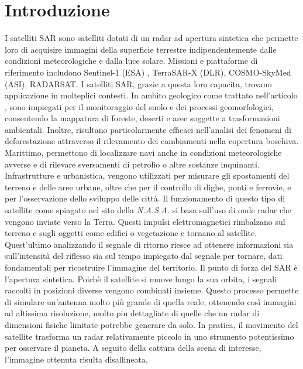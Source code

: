 
\chapter{Introduzione}
I satelliti SAR sono satelliti dotati di un radar ad apertura sintetica che permette
loro di acquisire immagini della superficie terrestre indipendentemente dalle 
condizioni meteorologiche e dalla luce solare. 
Missioni e piattaforme di riferimento includono Sentinel-1 (ESA) \cite{esa_sentinel1}, TerraSAR-X (DLR), 
COSMO-SkyMed (ASI), RADARSAT.
I satelliti SAR, grazie a questa loro 
capacita, trovano applicazione in molteplici contesti. In ambito geologico come trattato nell'articolo \cite{nhess-20-2379-2020}, 
sono impiegati per il monitoraggio del suolo e dei processi 
geomorfologici, consentendo la mappatura di foreste, deserti e aree soggette a 
trasformazioni ambientali. Inoltre, risultano particolarmente efficaci nell’analisi 
dei fenomeni di deforestazione attraverso il rilevamento dei cambiamenti nella 
copertura boschiva. Marittimo, permettono di localizzare navi anche in condizioni 
meteorologiche avverse e di rilevare sversamenti di petrolio o altre sostanze 
inquinanti. Infrastrutture e urbanistica, vengono utilizzati per misurare gli 
spostamenti del terreno e delle aree urbane, oltre che per il controllo di dighe, 
ponti e ferrovie, e per l’osservazione dello sviluppo delle città. Il funzionamento 
di questo tipo di satellite come spiagato nel sito della \textit{N.A.S.A.} \cite{nasa_sar} si basa sull'uso di  onde radar che vengono inviate verso la Terra. 
Questi impulsi elettromagnetici rimbalzano sul terreno e sugli 
oggetti come edifici o vegetazione e tornano al satellite. 
Quest'ultimo analizzando il segnale di 
ritorno riesce ad ottenere informazioni sia sull'intensità del riflesso sia sul tempo impiegato 
dal segnale per tornare, dati fondamentali per ricostruire l'immagine del territorio. Il punto 
di forza del SAR è l'apertura sintetica. Poichè il satellite si muove lungo la sua orbita, i 
segnali raccolti in posizioni diverse vengono combinati insieme. Questo processo permette di 
simulare un'antenna molto più grande di quella reale, ottenendo così immagini ad altissima 
risoluzione, molto piu dettagliate di quelle che un radar di dimensioni fisiche limitate potrebbe 
generare da solo. In pratica, il movimento del satellite trasforma un radar relativamente piccolo 
in uno strumento potentissimo per osservare il pianeta. 
A seguito della cattura della scena di interesse, l’immagine ottenuta risulta disallineata, 
